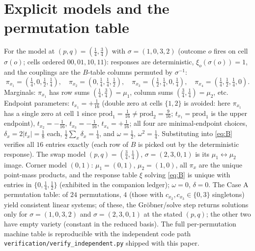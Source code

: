 \documentclass[11pt,a4paper]{article}
\newcommand{\dd}{\delta}
\begin{document}
\section{Explicit models and the permutation table}
For the model at $(p,q)=(\tfrac14,\tfrac34)$ with $\sigma=(1,0,3,2)$ (outcome $o$ fires on cell $\sigma(o)$; cells ordered $00,01,10,11$): responses are deterministic, $\xi_o(\sigma(o))=1$, and the couplings are the $B$-table columns permuted by $\sigma^{-1}$:
\[
\pi_{x_1}=(\tfrac14,0,\tfrac12,\tfrac14),\quad
\pi_{x_2}=(0,\tfrac14,\tfrac14,\tfrac12),\quad
\pi_{x_3}=(\tfrac12,\tfrac14,0,\tfrac14),\quad
\pi_{x_4}=(\tfrac14,\tfrac12,\tfrac14,0).
\]
Marginals: $\pi_{x_1}$ has row sums $(\tfrac14,\tfrac34)=\mu_1$, column sums $(\tfrac34,\tfrac14)=\mu_2$, etc. Endpoint parameters: $t_{x_1}=+\tfrac1{16}$ (double zero at cells $\{1,2\}$ is avoided: here $\pi_{x_1}$ has a single zero at cell $1$ since $\mathrm{prod}_1=\tfrac1{16}\ne\mathrm{prod}_2=\tfrac9{16}$; $t_{x_1}=\mathrm{prod}_1$ is the upper endpoint), $t_{x_2}=-\tfrac1{16}$, $t_{x_3}=-\tfrac1{16}$, $t_{x_4}=+\tfrac1{16}$; all four are minimal-endpoint choices, $\dd_x=2|t_x|=\tfrac18$ each, $\tfrac12\sum_x\dd_x=\tfrac14$, and $\omega=\tfrac12$, $\omega^2=\tfrac14$. Substituting into \eqref{eq:B} verifies all $16$ entries exactly (each row of $B$ is picked out by the deterministic response). The swap model $(p,q)=(\tfrac34,\tfrac14)$, $\sigma=(2,3,0,1)$ is its $\mu_1\leftrightarrow\mu_2$ image. Corner model $(0,1)$: $\mu_1=(0,1)$, $\mu_2=(1,0)$, all $\pi_x$ are the unique point-mass products, and the response table $\xi$ solving \eqref{eq:B} is unique with entries in $\{0,\tfrac14,\tfrac12\}$ (exhibited in the companion ledger); $\omega=0$, $\dd=0$. The Case A permutation table: of $24$ permutations, $4$ (those with $c_{x_2},c_{x_3}\in\{0,3\}$ singletons) yield consistent linear systems; of these, the Gr\"obner/solve step returns solutions only for $\sigma=(1,0,3,2)$ and $\sigma=(2,3,0,1)$ at the stated $(p,q)$; the other two have empty variety (constant in the reduced basis). The full per-permutation machine table is reproducible with the independent code path \texttt{verification/verify\_independent.py} shipped with this paper.
\end{document}
